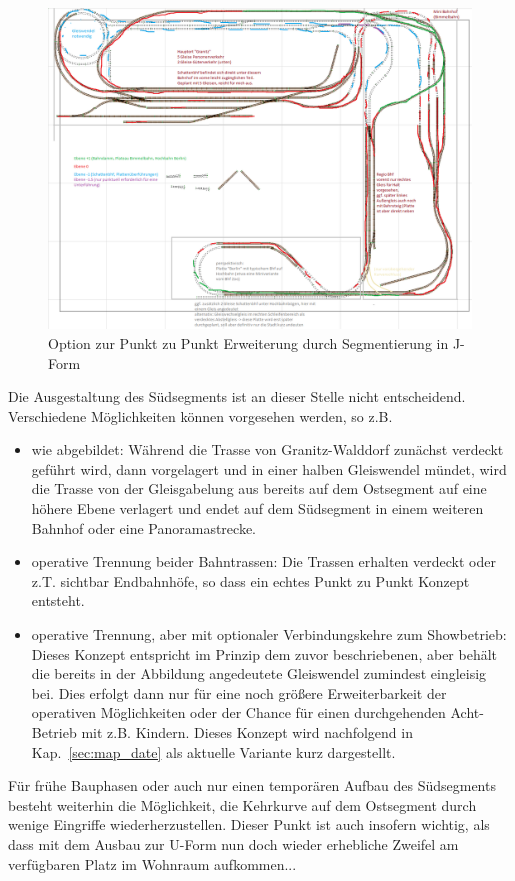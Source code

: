 \begin{figure}[h]
\centering
  \includegraphics[width=1.0\textwidth]{img/map_evolution/state3_granitz_modules.png}
	\caption{Option zur Punkt zu Punkt Erweiterung durch Segmentierung in J-Form}
	\label{img:state3_granitz_modules}
\end{figure}

Die Ausgestaltung des S\"udsegments ist an dieser Stelle nicht entscheidend.
Verschiedene M\"oglichkeiten k\"onnen vorgesehen werden, so z.B.
\begin{itemize}
	\item wie abgebildet:
	W\"ahrend die Trasse von Granitz-Walddorf zun\"achst verdeckt gef\"uhrt wird, dann vorgelagert und in einer halben Gleiswendel m\"undet, wird die Trasse von der Gleisgabelung aus bereits auf dem Ostsegment auf eine h\"ohere Ebene verlagert und endet auf dem S\"udsegment in einem weiteren Bahnhof oder eine Panoramastrecke.
	\item operative Trennung beider Bahntrassen:
	Die Trassen erhalten verdeckt oder z.T. sichtbar Endbahnh\"ofe, so dass ein echtes Punkt zu Punkt Konzept entsteht.
	\item operative Trennung, aber mit optionaler Verbindungskehre zum Showbetrieb:
	Dieses Konzept entspricht im Prinzip dem zuvor beschriebenen, aber beh\"alt die bereits in der Abbildung angedeutete Gleiswendel zumindest eingleisig bei.
	Dies erfolgt dann nur f\"ur eine noch gr\"o{\ss}ere Erweiterbarkeit der operativen M\"oglichkeiten oder der Chance f\"ur einen durchgehenden Acht-Betrieb mit z.B. Kindern.
	Dieses Konzept wird nachfolgend in Kap.~\ref{sec:map_date} als aktuelle Variante kurz dargestellt.
\end{itemize}
F\"ur fr\"uhe Bauphasen oder auch nur einen tempor\"aren Aufbau des S\"udsegments besteht weiterhin die M\"oglichkeit, die Kehrkurve auf dem Ostsegment durch wenige Eingriffe wiederherzustellen.
Dieser Punkt ist auch insofern wichtig, als dass mit dem Ausbau zur U-Form nun doch wieder erhebliche Zweifel am verf\"ugbaren Platz im Wohnraum aufkommen...

